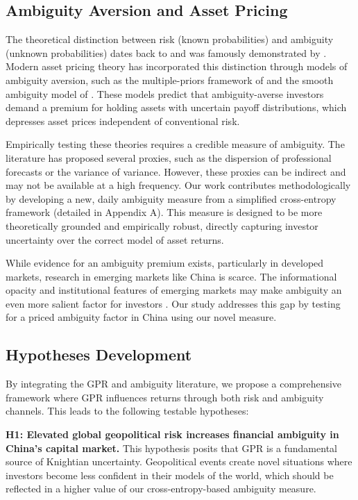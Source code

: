 \documentclass[preprint,12pt,authoryear]{elsarticle}
\begin{document}
\subsection{Ambiguity Aversion and Asset Pricing}

The theoretical distinction between risk (known probabilities) and ambiguity (unknown probabilities) dates back to \citet{Knight1921} and was famously demonstrated by \citet{Ellsberg1961}. Modern asset pricing theory has incorporated this distinction through models of ambiguity aversion, such as the multiple-priors framework of \citet{Gilboa1989} and the smooth ambiguity model of \citet{Klibanoff2005}. These models predict that ambiguity-averse investors demand a premium for holding assets with uncertain payoff distributions, which depresses asset prices independent of conventional risk.

Empirically testing these theories requires a credible measure of ambiguity. The literature has proposed several proxies, such as the dispersion of professional forecasts \citep{Brenner2018, Ulrich2013} or the variance of variance. However, these proxies can be indirect and may not be available at a high frequency. Our work contributes methodologically by developing a new, daily ambiguity measure from a simplified cross-entropy framework (detailed in Appendix A). This measure is designed to be more theoretically grounded and empirically robust, directly capturing investor uncertainty over the correct model of asset returns.

While evidence for an ambiguity premium exists, particularly in developed markets, research in emerging markets like China is scarce. The informational opacity and institutional features of emerging markets may make ambiguity an even more salient factor for investors \citep{Easley2009}. Our study addresses this gap by testing for a priced ambiguity factor in China using our novel measure.

\subsection{Hypotheses Development}

By integrating the GPR and ambiguity literature, we propose a comprehensive framework where GPR influences returns through both risk and ambiguity channels. This leads to the following testable hypotheses:

\textbf{H1: Elevated global geopolitical risk increases financial ambiguity in China's capital market.}
This hypothesis posits that GPR is a fundamental source of Knightian uncertainty. Geopolitical events create novel situations where investors become less confident in their models of the world, which should be reflected in a higher value of our cross-entropy-based ambiguity measure.
\end{document}
